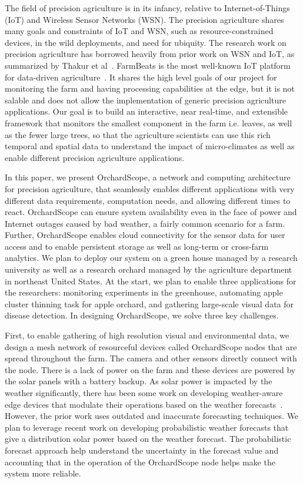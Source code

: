 The field of precision agriculture is in its infancy, relative to Internet-of-Things (IoT) and Wireless Sensor Networks (WSN). The precision agriculture shares many goals and constraints of IoT and WSN, such as resource-constrained devices, in the wild deployments, and need for ubiquity. The research work on precision agriculture has borrowed heavily from prior work on WSN and IoT, as summarized by Thakur et al~\cite{thakur2019applicability}. FarmBeats is the most well-known IoT platform for data-driven agriculture~\cite{vasisht2017farmbeats, kapetanovic2017experiences, jain2019low}. It shares the high level goals of our project for monitoring the farm and having processing capabilities at the edge, but it is not salable and does not allow the implementation of generic precision agriculture applications. 
Our goal is to build an interactive, near real-time, and extensible framework that monitors the smallest component in the farm i.e. leaves, as well as the fewer large trees, so that the agriculture scientists can use this rich temporal and spatial data to understand the impact of micro-climates as well as enable different precision agriculture applications.

In this paper, we present OrchardScope, a network and computing architecture for precision agriculture, that seamlessly enables different applications with very different data requirements, computation needs, and allowing different times to react. OrchardScope can ensure system availability  even  in  the  face  of  power  and  Internet  outages caused by bad weather, a fairly common scenario for a farm.  Further, OrchardScope enables cloud connectivity for the sensor data for user access and to enable persistent storage as well as long-term or cross-farm analytics. We plan to deploy our system on a green house managed by a research university as well as a research orchard managed by the agriculture department in northeast United States. At the start, we plan to enable three applications for the researchers: monitoring experiments in the greenhouse, automating apple cluster thinning task for apple orchard, and gathering large-scale visual data for disease detection. In designing OrchardScope, we solve three key challenges. 

First, to enable gathering of high resolution visual and environmental data, we design a mesh network of resourceful devices called OrchardScope nodes that are spread throughout the farm. The camera and other sensors directly connect with the node. There is a lack of power on the farm and these devices are powered by the solar panels with a battery backup. As solar power is impacted by the weather significantly, there has been some work on developing weather-aware edge devices that modulate their operations based on the weather forecasts~\cite{vasisht2017farmbeats}. However, the prior work uses outdated and inaccurate forecasting techniques. We plan to leverage recent work on developing probabilistic weather forecasts that give a distribution solar power based on the weather forecast. The probabilistic forecast approach help understand the uncertainty in the forecast value and accounting that in the operation of the OrchardScope node helps make the system more reliable. 

